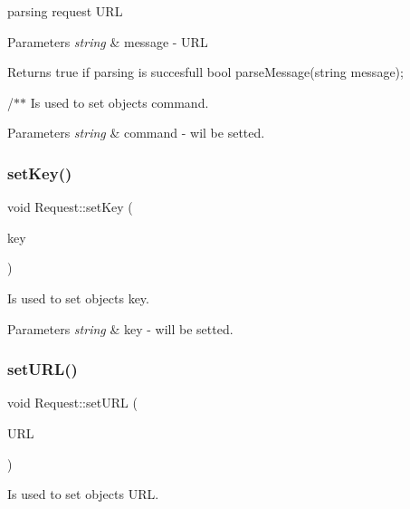 parsing request U\+RL 


\begin{DoxyParams}{Parameters}
{\em string} & message -\/ U\+RL \\
\hline
\end{DoxyParams}
\begin{DoxyReturn}{Returns}
true if parsing is succesfull bool parse\+Message(string message);
\end{DoxyReturn}
/$\ast$$\ast$ Is used to set object\textquotesingle{}s command. 
\begin{DoxyParams}{Parameters}
{\em string} & command -\/ wil be setted. \\
\hline
\end{DoxyParams}
\mbox{\label{classRequest_a56210902bb0d240b4615d6fde144ea42}} 
\subsubsection{\texorpdfstring{set\+Key()}{setKey()}}
{\footnotesize\ttfamily void Request\+::set\+Key (\begin{DoxyParamCaption}\item[{string}]{key }\end{DoxyParamCaption})}



Is used to set object\textquotesingle{}s key. 


\begin{DoxyParams}{Parameters}
{\em string} & key -\/ will be setted. \\
\hline
\end{DoxyParams}
\mbox{\label{classRequest_a1a46a4b8f73d3eb03c39ada91b26eeed}} 
\subsubsection{\texorpdfstring{set\+U\+R\+L()}{setURL()}}
{\footnotesize\ttfamily void Request\+::set\+U\+RL (\begin{DoxyParamCaption}\item[{string}]{U\+RL }\end{DoxyParamCaption})}



Is used to set object\textquotesingle{}s U\+RL. 


